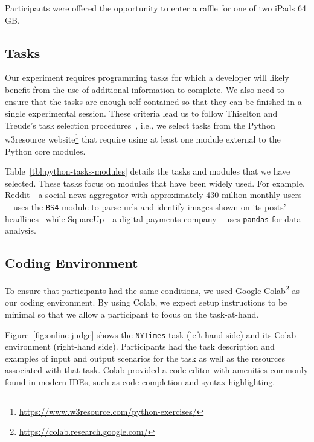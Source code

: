 {Participants were offered the opportunity to enter a raffle for one of two iPads 64 GB.




\subsection{Tasks}


Our experiment requires programming tasks for which a developer will likely benefit from the use of additional information to complete. We also need to ensure that the tasks are enough self-contained so that they can be finished in a single experimental session. These criteria lead us to 
follow Thiselton and Treude's task selection procedures~\cite{thiselton2019}, 
i.e., we select tasks from the Python w3resource website\footnote{\url{https://www.w3resource.com/python-exercises/}}
that require using at least one module external to the Python core modules. 



Table~\ref{tbl:python-tasks-modules} details the tasks and modules that we have selected. These tasks focus on modules that have been widely used.
For example, Reddit---a social news aggregator with approximately 430 million monthly users---uses the \texttt{BS4} module
to parse 
urls and identify images shown on its posts' headlines~\cite{bs4-reddit} while SquareUp---a digital  payments company---uses \texttt{pandas} for data analysis. 









\subsection{Coding Environment}


To ensure that participants had the same conditions, we used Google Colab\footnote{\url{https://colab.research.google.com/}} as our coding environment. 
By using Colab, we expect setup instructions to be minimal 
so that we allow a participant to focus on the task-at-hand.



Figure~\ref{fig:online-judge} shows the \texttt{NYTimes} task (left-hand side) and its Colab environment (right-hand side). 
Participants had the task description and examples of input and output scenarios for the task as well as the resources associated with that task. 
Colab provided a code editor with amenities commonly found in modern IDEs, such as code completion and syntax highlighting. 

}
